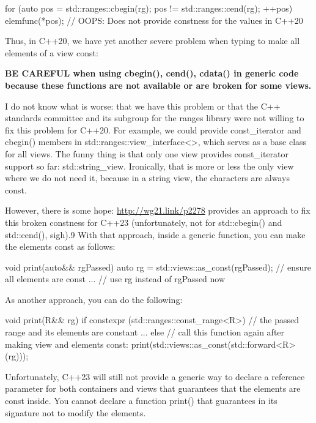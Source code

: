 \begin{cpp}
for (auto pos = std::ranges::cbegin(rg); pos != std::ranges::cend(rg); ++pos) {
	elemfunc(*pos); // OOPS: Does not provide constness for the values in C++20
}
\end{cpp}

Thus, in C++20, we have yet another severe problem when typing to make all elements of a view const:

\textbf{BE CAREFUL when using cbegin(), cend(), cdata() in generic code because these functions are not available or are broken for some views.}

I do not know what is worse: that we have this problem or that the C++ standards committee and its subgroup for the ranges library were not willing to fix this problem for C++20. For example, we could provide const\_iterator and cbegin() members in std::ranges::view\_interface<>, which serves as a base class for all views. The funny thing is that only one view provides const\_iterator support so far: std::string\_view. Ironically, that is more or less the only view where we do not need it, because in a string view, the characters are always const.

However, there is some hope: \url{http://wg21.link/p2278} provides an approach to fix this broken constness for C++23 (unfortunately, not for std::cbegin() and std::cend(), sigh).9 With that approach, inside a generic function, you can make the elements const as follows:

\begin{cpp}
void print(auto&& rgPassed)
{
	auto rg = std::views::as_const(rgPassed); // ensure all elements are const
	... // use rg instead of rgPassed now
}
\end{cpp}

As another approach, you can do the following:

\begin{cpp}
void print(R&& rg)
{
	if constexpr (std::ranges::const_range<R>) {
		// the passed range and its elements are constant
		...
	}
	else {
		// call this function again after making view and elements const:
		print(std::views::as_const(std::forward<R>(rg)));
	}
}
\end{cpp}

Unfortunately, C++23 will still not provide a generic way to declare a reference parameter for both containers and views that guarantees that the elements are const inside. You cannot declare a function print() that guarantees in its signature not to modify the elements.

